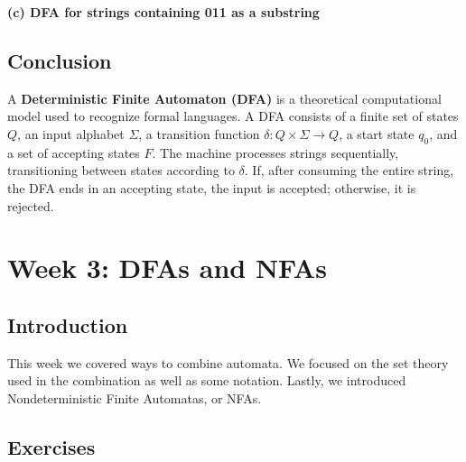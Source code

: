 \documentclass{article}
\theoremstyle{theorem}
\theoremstyle{definition}
\theoremstyle{remark}
\begin{document}
\textbf{(c) DFA for strings containing 011 as a substring}

\begin{center}
\end{center}

\subsection{Conclusion}
A \textbf{Deterministic Finite Automaton (DFA)} is a theoretical computational model used to recognize formal languages. A DFA consists of a finite set of states \( Q \), an input alphabet \( \Sigma \), a transition function \( \delta: Q \times \Sigma \to Q \), a start state \( q_0 \), and a set of accepting states \( F \). The machine processes strings sequentially, transitioning between states according to \( \delta \). If, after consuming the entire string, the DFA ends in an accepting state, the input is accepted; otherwise, it is rejected.

\newpage

\section{Week 3: DFAs and NFAs}

\subsection{Introduction}
This week we covered ways to combine automata. We focused on the set theory used in the combination as well as some notation.  
Lastly, we introduced Nondeterministic Finite Automatas, or NFAs.

\subsection{Exercises}
\end{document}
